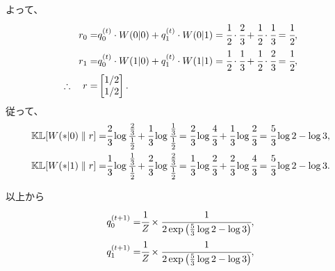 よって、
\begin{align*}
	r_0
		=& q_0^{(t)} \cdot W(0|0) + q_1^{(t)} \cdot W (0|1)
		= \cfrac{1}{2} \cdot \cfrac{2}{3} + \cfrac{1}{2} \cdot \cfrac{1}{3}
		= \cfrac{1}{2}, \\
	r_1
		=& q_0^{(t)} \cdot W(1|0) + q_1^{(t)} \cdot W (1|1)
		= \cfrac{1}{2} \cdot \cfrac{1}{3} + \cfrac{1}{2} \cdot \cfrac{2}{3}
		= \cfrac{1}{2}, \\
	\therefore\quad
	r =& \begin{bmatrix} 1/2 \\ 1/2 \end{bmatrix}.
\end{align*}
従って、
\begin{align*}
	\mathbb{KL}[W (\ast|0) \parallel r]
	=& \cfrac{2}{3} \log \cfrac{\frac{2}{3}}{\frac{1}{2}} + \cfrac{1}{3} \log \cfrac{\frac{1}{3}}{\frac{1}{2}}
	= \cfrac{2}{3} \log \cfrac{4}{3} + \cfrac{1}{3} \log \cfrac{2}{3} 
	= \cfrac{5}{3} \log 2 - \log 3 , \\
	\mathbb{KL}[ W(\ast|1) \parallel r]
	=& \cfrac{1}{3} \log \cfrac{\frac{1}{3}}{\frac{1}{2}} + \cfrac{2}{3} \log \cfrac{\frac{2}{3}}{\frac{1}{2}}
	= \cfrac{1}{3} \log \cfrac{2}{3} + \cfrac{2}{3} \log \cfrac{4}{3}
	= \cfrac{5}{3} \log 2 - \log 3.
\end{align*}

以上から
\begin{align*}
	q^{(t+1)}_0 
		=& \cfrac{1}{Z} \times \cfrac{1}{2 \exp \left(\frac{5}{3} \log 2 - \log 3 \right)}, \\
	q^{(t+1)}_1
		=& \cfrac{1}{Z} \times \cfrac{1}{2 \exp \left(\frac{5}{3} \log 2 - \log 3 \right)},
\end{align*}
